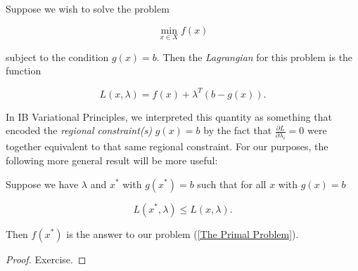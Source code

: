 \documentclass[11pt]{scrartcl}
\begin{document}
\begin{definition}
Suppose we wish to solve the problem

\[ \min_{x \in X} f(x) \]

subject to the condition $g(x)=b$. Then the \emph{Lagrangian} for this problem is the function

\[L(x, \lambda) = f(x) + \lambda^T (b - g(x)). \]
\end{definition}

In IB Variational Principles, we interpreted this quantity as something that encoded the \textit{regional constraint(s)} $g(x)=b$ by the fact that $\frac{\partial L}{\partial \lambda_i} = 0$ were together equivalent to that same regional constraint. For our purposes, the following more general result will be more useful:

\begin{theorem}

Suppose we have $\lambda$ and $x^*$ with $g(x^*)=b$ such that for all $x$ with $g(x)=b$

\[ L(x^*, \lambda) \le L(x, \lambda). \]

Then $f(x^*)$ is the answer to our problem (\ref{The Primal Problem}).

\begin{proof}
Exercise.
\end{proof}
\end{theorem}
\end{document}
